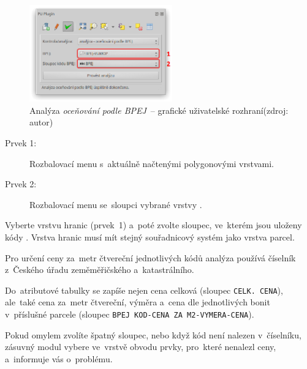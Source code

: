 	\begin{figure}[H] \centering
		\includegraphics[width=0.55\textwidth]{./pictures/analyza_bpej.png}
		\caption[Analýza \textit{oceňování podle BPEJ}~–
grafické uživatelské rozhraní]{Analýza \textit{oceňování podle BPEJ}~–
grafické uživatelské rozhraní\newline (zdroj: autor)}
		\label{fig:manual_analyza_bpej_gui}
 	\end{figure}

\begin{description}
	\item[Prvek 1:] Rozbalovací menu s~aktuálně načtenými
polygonovými vrstvami.
	\item[Prvek 2:] Rozbalovací menu se~sloupci vybrané vrstvy
.
\end{description}

Vyberte vrstvu hranic  (prvek~1) a~poté zvolte sloupec,
ve~kterém jsou uloženy kódy . Vrstva hranic  musí
mít stejný souřadnicový systém jako vrstva parcel.

Pro určení ceny za~metr čtvereční jednotlivých kódů  analýza
používá číselník  z~Českého úřadu zeměměřičského
a~katastrálního.

Do~atributové tabulky se zapíše nejen cena celková (sloupec
\texttt{CELK. CENA}), ale~také cena za~metr čtvereční, výměra a~cena
dle jednotlivých bonit v~příslušné parcele (sloupec \texttt{BPEJ
KOD-CENA ZA M2-VYMERA-CENA}).

Pokud omylem zvolíte špatný slou\-pec, nebo když kód  není
nalezen v~číselníku, zásuvný modul vybere ve~vrstvě obvodu prvky,
pro~které nenalezl ceny, a~informuje vás o~problému.
